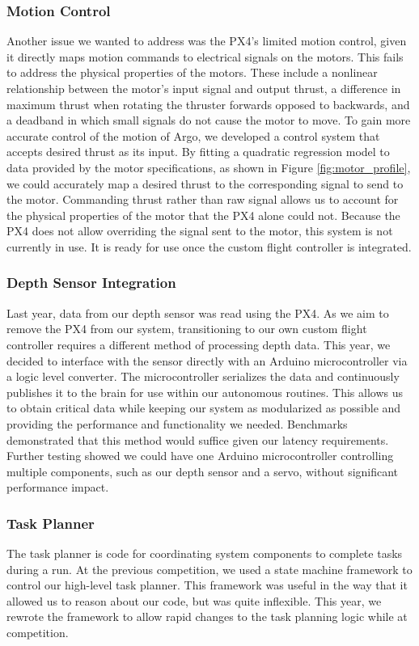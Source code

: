 \documentclass[conference]{IEEEtran}
\begin{document}
\subsubsection{Motion Control}
\label{sssec:motion_control}
Another issue we wanted to address was the PX4’s limited motion control, given it directly maps motion commands to electrical signals on the motors. This fails to address the physical properties of the motors. These include a nonlinear relationship between the motor’s input signal and output thrust, a difference in maximum thrust when rotating the thruster forwards opposed to backwards, and a deadband in which small signals do not cause the motor to move.
To gain more accurate control of the motion of Argo, we developed a control system that accepts desired thrust as its input. By fitting a quadratic regression model to data provided by the motor specifications, as shown in Figure \ref{fig:motor_profile}, we could accurately map a desired thrust to the corresponding signal to send to the motor. Commanding thrust rather than raw signal allows us to account for the physical properties of the motor that the PX4 alone could not. Because the PX4 does not allow overriding the signal sent to the motor, this system is not currently in use. It is ready for use once the custom flight controller is integrated.

\subsubsection{Depth Sensor Integration}
\label{sssec:depth_sensor}
Last year, data from our depth sensor was read using the PX4. As we aim to remove the PX4 from our system, transitioning to our own custom flight controller requires a different method of processing depth data. This year, we decided to interface with the sensor directly with an Arduino microcontroller via a logic level converter. The microcontroller serializes the data and continuously publishes it to the brain for use within our autonomous routines. This allows us to obtain critical data while keeping our system as modularized as possible and providing the performance and functionality we needed. Benchmarks demonstrated that this method would suffice given our latency requirements. Further testing showed we could have one Arduino microcontroller controlling multiple components, such as our depth sensor and a servo, without significant performance impact.

\subsubsection{Task Planner}
\label{sssec:task_planner}
The task planner is code for coordinating system components to complete tasks during a run. At the previous competition, we used a state machine framework to control our high-level task planner. This framework was useful in the way that it allowed us to reason about our code, but was quite inflexible. This year, we rewrote the framework to allow rapid changes to the task planning logic while at competition.
\end{document}
